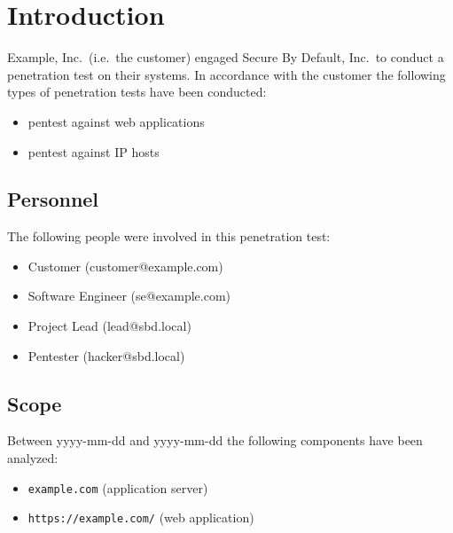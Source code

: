 \documentclass[a4paper]{article}
\newcommand{\passthrough}[1]{\colorbox{code}{\lstset{mathescape=false}#1}}
\begin{document}
\clearpage
\tableofcontents

\clearpage
\section{Introduction}

Example, Inc.\ (i.e.\ the customer) engaged Secure By Default, Inc.\ to conduct a penetration test on their systems.
In accordance with the customer the following types of penetration tests have been conducted:

\begin{itemize}
      \item pentest against web applications

      \item pentest against IP hosts

  \end{itemize}

\subsection{Personnel}

The following people were involved in this penetration test:

\begin{itemize}
      \item Customer (customer@example.com)

      \item Software Engineer (se@example.com)

      \item Project Lead (lead@sbd.local)

      \item Pentester (hacker@sbd.local)

  \end{itemize}

\subsection{Scope}

Between yyyy-mm-dd and yyyy-mm-dd the following components have been analyzed:

\begin{itemize}
      \item \passthrough{\lstinline!example.com!} (application server)

      \item \passthrough{\lstinline!https://example.com/!} (web application)

  \end{itemize}
\end{document}
